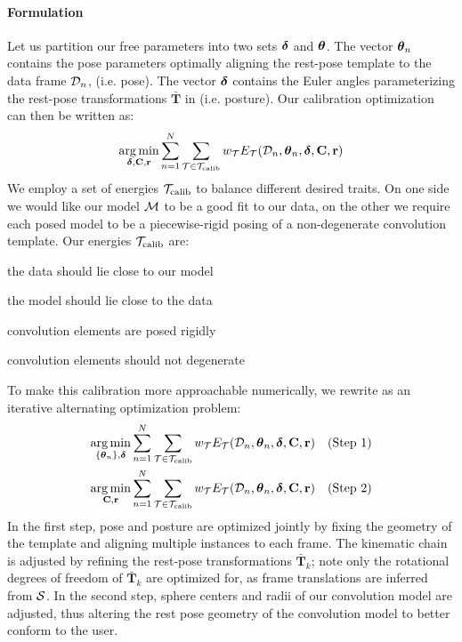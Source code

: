 \paragraph{Formulation}
Let us partition our free parameters into two sets $\boldsymbol{\delta}$ and $\boldsymbol{\theta}$. 
The vector $\boldsymbol{\theta}_n$ contains the pose parameters optimally aligning the rest-pose template to the data frame $\mathcal{D}_n$, (i.e. pose). 
The vector $\boldsymbol{\delta}$ contains the Euler angles parameterizing the rest-pose transformations $\mathbf{\bar{T}}$ in  (i.e. posture).
% 
Our calibration optimization can then be written as:
\begin{eqnarray}
\operatorname*{arg\,min}_{\boldsymbol{\delta}, \mathbf{C}, \mathbf{r}}
\sum_{n=1}^N 
\sum_{\mathcal{T} \in {\mathcal{T}_\text{calib}}} 
w_\mathcal{T} E_\mathcal{T}(\mathcal{D}_n, \boldsymbol{\theta}_n, \boldsymbol{\delta}, \mathbf{C}, \mathbf{r})
\label{eq:calibration}
\end{eqnarray}
% 
We employ a set of energies ${\mathcal{T}_\text{calib}}$ to balance different desired traits. On one side we would like our model $\mathcal{M}$ to be a good fit to our data, on the other we require each posed model to be a piecewise-rigid posing of a non-degenerate convolution template. Our energies ${\mathcal{T}_\text{calib}}$ are:
% 
\begin{description}[labelsep=0em,labelwidth=.4in,labelindent=1cm]
\item[d2m] the data should lie close to our model
\item[m2d] the model should lie close to the data
\item[rigid] convolution elements are posed rigidly
\item[valid] convolution elements should not degenerate
\end{description}
% 
To make this calibration more approachable numerically, we rewrite  as an iterative alternating optimization problem:
% 
\begin{eqnarray}
\operatorname*{arg\,min}_{{\{\boldsymbol{\theta}_n\}},\boldsymbol{\delta}} 
\sum_{n=1}^N 
\sum_{\mathcal{T} \in {\mathcal{T}_\text{calib}}}
w_\mathcal{T} E_\mathcal{T}(\mathcal{D}_n, \boldsymbol{\theta}_n, \boldsymbol{\delta}, \mathbf{C}, \mathbf{r}) 
&& \text{(Step 1)}
\label{eq:step1}
\\
\operatorname*{arg\,min}_{\mathbf{C}, \mathbf{r}} 
\sum_{n=1}^N 
\sum_{\mathcal{T} \in {\mathcal{T}_\text{calib}}}
w_\mathcal{T} E_\mathcal{T}(\mathcal{D}_n, \boldsymbol{\theta}_n, \boldsymbol{\delta}, \mathbf{C}, \mathbf{r})
&& \text{(Step 2)}
\label{eq:step2}
\end{eqnarray}
% 
In the first step, pose and posture are optimized jointly by fixing the geometry of the template and aligning multiple instances to each frame. The kinematic chain is adjusted by refining the rest-pose transformations $\mathbf{\bar{T}}_k$; note only the rotational degrees of freedom of $\mathbf{\bar{T}}_k$ are optimized for, as frame translations are inferred from $\mathcal{S}$. In the second step, sphere centers and radii of our convolution model are adjusted, thus altering the rest pose geometry of the convolution model to better conform to the user.

